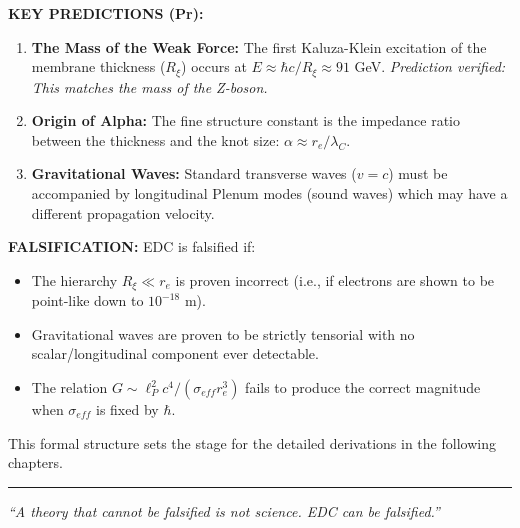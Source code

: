 \begin{tcolorbox}[colback=blue!5,colframe=blue!70]
\textbf{KEY PREDICTIONS (Pr):}
\begin{enumerate}
    \item \textbf{The Mass of the Weak Force:}
    The first Kaluza-Klein excitation of the membrane thickness ($R_\xi$) occurs at $E \approx \hbar c / R_\xi \approx 91$ GeV. 
    \textit{Prediction verified: This matches the mass of the Z-boson.}
    
    \item \textbf{Origin of Alpha:}
    The fine structure constant is the impedance ratio between the thickness and the knot size: $\alpha \approx r_e/\lambda_C$.
    
    \item \textbf{Gravitational Waves:}
    Standard transverse waves ($v=c$) must be accompanied by longitudinal Plenum modes (sound waves) which may have a different propagation velocity.
\end{enumerate}

\textbf{FALSIFICATION:}
EDC is falsified if:
\begin{itemize}
    \item The hierarchy $R_\xi \ll r_e$ is proven incorrect (i.e., if electrons are shown to be point-like down to $10^{-18}$ m).
    \item Gravitational waves are proven to be strictly tensorial with no scalar/longitudinal component ever detectable.
    \item The relation $G \sim \ell_P^2 c^4/(\sigma_{eff} r_e^3)$ fails to produce the correct magnitude when $\sigma_{eff}$ is fixed by $\hbar$.
\end{itemize}

This formal structure sets the stage for the detailed derivations in the following chapters.
\end{tcolorbox}

\vspace{2em}
\begin{center}
\rule{0.5\textwidth}{0.4pt}

\textit{``A theory that cannot be falsified is not science. EDC can be falsified.''}
\end{center}

